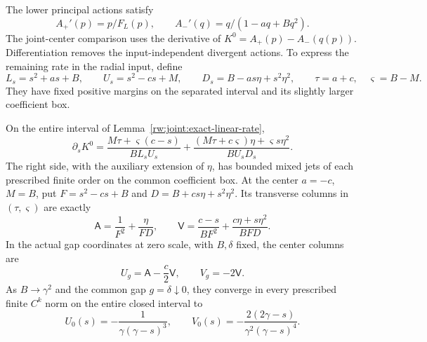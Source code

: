 The lower principal actions satisfy
\[
 A_+'(p)=p/F_L(p),\qquad
 A_-'(q)=q/(1-aq+Bq^2).
\]
The joint-center comparison uses the derivative of
$K^0=A_+(p)-A_-(q(p))$. Differentiation removes the input-independent
divergent actions. To express the remaining rate in the radial input,
define
\[
 L_s=s^2+as+B,\qquad U_s=s^2-cs+M,\qquad
 D_s=B-as\eta+s^2\eta^2,\qquad
 \tau=a+c,\quad\varsigma=B-M.
\]
They have fixed positive margins on the separated interval and its
slightly larger coefficient box.

\begin{lemma}
\label{rw:joint:principal-columns}
On the entire interval of Lemma~\ref{rw:joint:exact-linear-rate},
\begin{equation}\label{rw:joint:principal-H}
 \partial_sK^0
 =\frac{M\tau+\varsigma(c-s)}{B L_s U_s}
  +\frac{(M\tau+c\varsigma)\eta+\varsigma s\eta^2}
           {B U_s D_s}.
\end{equation}
The right side, with the auxiliary extension of $\eta$, has bounded
mixed jets of each prescribed finite order on the common coefficient
box. At the center $a=-c$, $M=B$, put
$F=s^2-cs+B$ and $D=B+cs\eta+s^2\eta^2$. Its transverse columns
in $(\tau,\varsigma)$ are exactly
\begin{equation}\label{rw:joint:principal-original-columns}
 \mathsf A=\frac1{F^2}+\frac{\eta}{FD},\qquad
 \mathsf V=\frac{c-s}{BF^2}
                      +\frac{c\eta+s\eta^2}{BFD}.
\end{equation}
In the actual gap coordinates at zero scale, with $B,\delta$ fixed,
the center columns are
\[
 U_g=\mathsf A-\frac c2\mathsf V,\qquad V_g=-2\mathsf V.
\]
As $B\to\gamma^2$ and the common gap $g=\delta\downarrow0$,
they converge in every prescribed finite $C^k$ norm on the entire
closed interval to
\begin{equation}\label{rw:joint:limit-columns}
 U_0(s)=-\frac1{\gamma(\gamma-s)^3},\qquad
 V_0(s)=-\frac{2(2\gamma-s)}{\gamma^2(\gamma-s)^4}.
\end{equation}
\end{lemma}

